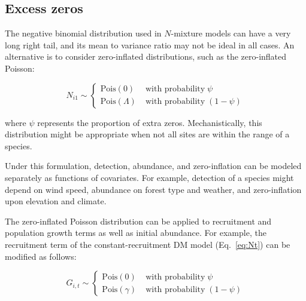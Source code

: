 \documentclass[12pt,english]{article}
\begin{document}
\begin{spacing}{1.9}
\begin{flushleft}
\subsection*{Excess zeros}

The negative binomial distribution used in $N$-mixture models can have
a very long right tail, and its mean to variance ratio may not be
ideal in all cases. An alternative is to consider zero-inflated
distributions, such as the zero-inflated Poisson:
\begin{linenomath*}
\begin{equation}
N_{i1} \sim \left\{
\begin{aligned}
\mbox{Pois}(0) &\; \text{with probability} \; \psi \\
\mbox{Pois}(\Lambda) &\; \text{with probability} \; (1-\psi)
\end{aligned} \right.
\label{eq:ZIP}
\end{equation}
\end{linenomath*}
where $\psi$ represents the proportion of extra zeros. 
Mechanistically, this distribution might be appropriate when not all sites are 
within the range of a species.

Under this formulation, 
detection, abundance, and zero-inflation can be modeled separately as
functions of covariates. For example, detection of a
species might depend on wind speed,
abundance on forest type and weather, and zero-inflation upon elevation and
climate.  

The zero-inflated Poisson distribution can be applied to recruitment and 
population growth terms as well as initial abundance. For example, 
the recruitment term of the constant-recruitment DM model
(Eq.~\ref{eq:Nt}) can be modified as follows:
\begin{linenomath*}
\begin{equation}
G_{i,t} \sim \left\{
\begin{aligned}
\mathrm{Pois}(0) &\; \text{with probability} \; \psi \\
\mathrm{Pois}(\gamma) &\; \text{with probability} \; (1-\psi)\end{aligned} \right.
\label{eq:ZIPts}
\end{equation}
\end{linenomath*}


\end{flushleft}
\end{spacing}
\end{document}
